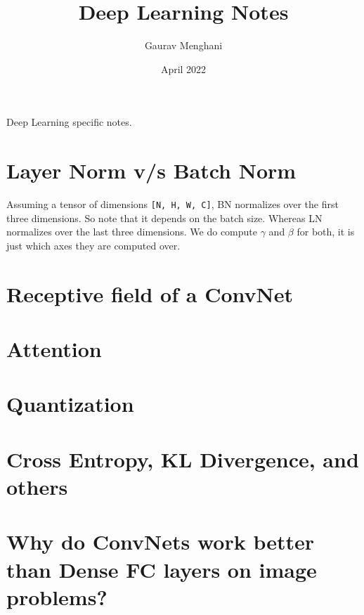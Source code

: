 \documentclass{article}
\title{Deep Learning Notes}
\author{Gaurav Menghani}
\date{April 2022}
\begin{document}
\maketitle

Deep Learning specific notes.

\section{Layer Norm v/s Batch Norm}
Assuming a tensor of dimensions \texttt{[N, H, W, C]}, BN normalizes over the first three dimensions. So note that it depends on the batch size. Whereas LN normalizes over the last three dimensions. We do compute $\gamma$ and $\beta$ for both, it is just which axes they are computed over.

\section{Receptive field of a ConvNet}

\section{Attention}

\section{Quantization}

\section{Cross Entropy, KL Divergence, and others}

\section{Why do ConvNets work better than Dense FC layers on image problems?}



\end{document}
